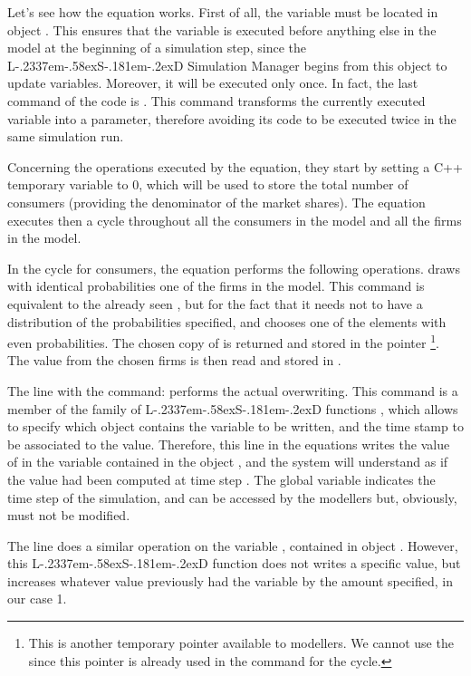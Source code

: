 \documentclass [11pt,a4paper] {book}
\def\LsD{{L\kern-.2337em\lower-.58ex\hbox{S}\kern-.181em\lower-.2ex\hbox{D}}\xspace}
\begin{document}
Let's see how the equation works. First of all, the variable must be located in object . This ensures that the variable is executed before anything else in the model at the beginning of a simulation step, since the \LsD Simulation Manager begins from this object to update variables. Moreover, it will be executed only once. In fact, the last command of the code is . This command transforms the currently executed variable into a parameter, therefore avoiding its code to be executed twice in the same simulation run.

Concerning the operations executed by the equation, they start by setting a C++ temporary variable to 0, which will be used to store the total number of consumers (providing the denominator of the market shares). The equation executes then a cycle throughout all the consumers in the model and all the firms in the model.

In the cycle for consumers, the equation performs the following operations.  draws with identical probabilities one of the firms in the model. This command is equivalent to the already seen , but for the fact that it needs not to have a distribution of the probabilities specified, and chooses one of the elements with even probabilities. The chosen copy of  is returned and stored in the pointer \footnote{This is another temporary pointer available to modellers. We cannot use the  since this pointer is already used in the command for the cycle.}. The  value from the chosen firms is then read and stored in .

The line with the command:  performs the actual overwriting. This command is a member of the family of \LsD functions , which allows to specify which object contains the variable to be written, and the time stamp to be associated to the value. Therefore, this line in the equations writes the value of  in the variable  contained in the object , and the system will understand as if the value had been computed at time step . The global variable  indicates the time step of the simulation, and can be accessed by the modellers but, obviously, must not be modified.

The line  does a similar operation on the variable , contained in object . However, this \LsD function does not writes a specific value, but increases whatever value previously had the variable by the amount specified, in our case 1.
\end{document}
